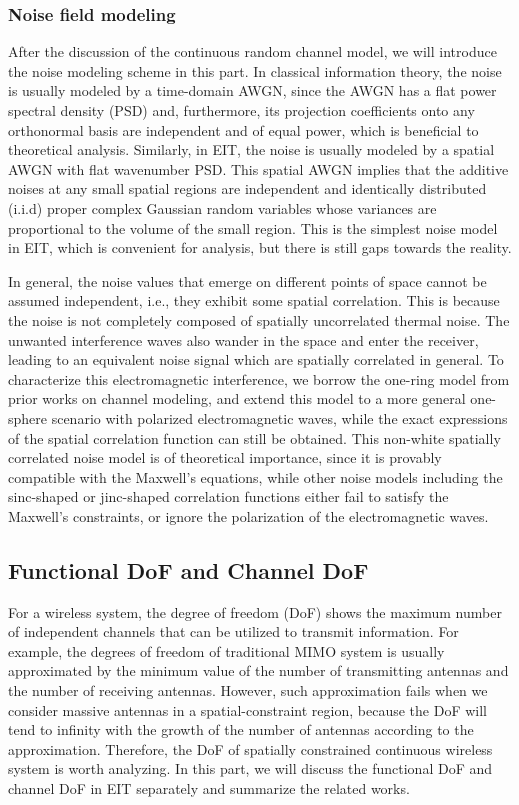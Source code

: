 \documentclass[journal,twocolumn]{IEEEtran}
\begin{document}
\subsubsection{Noise field modeling}
After the discussion of the continuous random channel model, we will introduce the noise modeling scheme in this part. In classical information theory, the noise is usually modeled by a time-domain AWGN, since the AWGN has a flat power spectral density (PSD) and,  furthermore, its projection coefficients onto any orthonormal basis are independent and of equal power, which is beneficial to theoretical analysis. 
Similarly, in EIT, the noise is usually modeled by a spatial AWGN with flat wavenumber PSD. This spatial AWGN implies that the additive noises at any small spatial regions are independent and identically distributed (i.i.d) proper complex Gaussian random variables whose variances are proportional to the volume of the small region. This is the simplest noise model in EIT, which is convenient for analysis, but there is still gaps towards the reality. 

In general, the noise values that emerge on different points of space cannot be assumed independent, i.e., they exhibit some spatial correlation. 
This is because the noise is not completely composed of spatially uncorrelated thermal noise. 
The unwanted interference waves also wander in the space and enter the receiver, leading to an equivalent noise signal which are spatially correlated in general. 
To characterize this electromagnetic interference, we borrow the one-ring model from prior works on channel modeling, and extend this model to a more general one-sphere scenario with polarized electromagnetic waves, while the exact expressions of the spatial correlation function can still be obtained. 
This non-white spatially correlated noise model is of theoretical importance, since it is provably compatible with the Maxwell's equations, while other noise models including the sinc-shaped or jinc-shaped correlation functions either fail to satisfy the Maxwell's constraints, or ignore the polarization of the electromagnetic waves. 


\subsection{Functional DoF and Channel DoF}
\label{Sec_3_Subsec_2}
For a wireless system, the degree of freedom (DoF) shows the maximum number of independent channels that can be utilized to transmit information. For example, the degrees of freedom of traditional MIMO system is usually approximated by the minimum value of the number of transmitting antennas and the number of receiving antennas. However, such approximation fails when we consider massive antennas in a spatial-constraint region, because the DoF will tend to infinity with the growth of the number of antennas according to the approximation. Therefore, the DoF of spatially constrained continuous wireless system is worth analyzing. In this part, we will discuss the functional DoF and channel DoF in EIT separately and summarize the related works.
\end{document}
